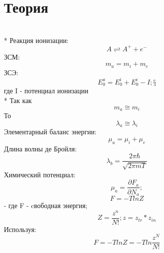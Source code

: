 \documentclass[letterpaper,12pt]{article}
\begin{document}
\section{Теория}
\\* Реакция ионизации:
\begin{equation} \label{eq:aperp} %
A\rightleftharpoons A^{+}+e^{-}
\end{equation}
ЗСМ:
\begin{equation} \label{eq:aperp} %
m_{a}=m_{i}+m_{e}
\end{equation}
ЗСЭ:
\begin{equation} \label{eq:aperp} %
E_{0}^{a}=E_{0}^{i}+E_{0}^{e}-I ;§
\end{equation}
где I - потенциал ионизации
\\*
Так как
\begin{equation} \label{eq:aperp} %
m_{a}\cong m_{i}
\end{equation}
То
\begin{equation} \label{eq:aperp} %
\lambda_{a}\cong \lambda_{i}
\end{equation} 
Элементарный баланс энергии:
\begin{equation} \label{eq:aperp} %
\mu_{a}=\mu_{i}+\mu_{e}
\end{equation}
Длина волны де Бройля:
\begin{equation} \label{eq:aperp} %
\lambda_{b}= \frac{2\pi\hbar}{\sqrt{2\pi m T}}
\end{equation}
Химический потенциал:
\begin{equation} \label{eq:aperp} %
\mu_{a}=\frac{\partial F_{a}}{\partial N_{a}} ;
\end{equation}
\begin{equation} \label{eq:aperp} %
F= -Tln{Z} 
\end{equation}
- где F - cвободная энергия; 
\begin{equation} \label{eq:aperp} %
Z = \frac{z^n}{N!}; z = z_{tr}*z_{in} 
\end{equation}
Используя:
\begin{equation} \label{eq:aperp} %
F = -Tln{Z}=-Tln{\frac{z^N}{N!}} 
\end{equation}
\end{document}

